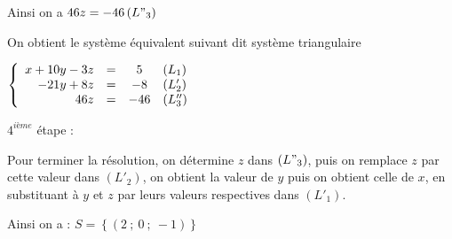 \documentclass[12pt,a4paper]{article}
\newcounter{solution}
\begin{document}
	Ainsi on a $46z=-46\left(L"_{3}\right)$

	On obtient le système équivalent suivant dit système triangulaire

												$ \left\{
                                                \begin{array}{rcc l}
                                                x + 10y - 3z & = & 5 & (L_1) \\
                                                -21y + 8z & = & -8 & (L'_2) \\
                                                46z & = & -46 & (L''_3)
                                                \end{array}
                                                \right.$
	
$4^{ième}$ étape :

	Pour terminer la résolution, on détermine $z$ dans $\left(L"_{3}\right)$, puis on remplace $z$ par cette valeur dans $\left(L'_{2}\right)$, on obtient la valeur de $y$ puis on obtient celle de $x$, en substituant à $y$ et $z$ par leurs valeurs respectives dans $\left(L'_{1}\right).$

	Ainsi on a : $S=\left\lbrace(2\ ;\ 0\ ;\ -1)\right\rbrace$
\end{document}
